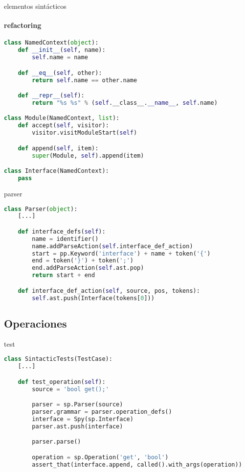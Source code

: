\documentclass[11pt]{beamer}
\begin{document}
\begin{frame}[fragile]{elementos sintácticos}
\framesubtitle{refactoring}
\begin{lstlisting}[language=Python]
class NamedContext(object):
    def __init__(self, name):
        self.name = name

    def __eq__(self, other):
        return self.name == other.name

    def __repr__(self):
        return "%s %s" % (self.__class__.__name__, self.name)

class Module(NamedContext, list):
    def accept(self, visitor):
        visitor.visitModuleStart(self)

    def append(self, item):
        super(Module, self).append(item)

class Interface(NamedContext):
    pass
\end{lstlisting}
\end{frame}


\begin{frame}[fragile]{parser}
\begin{lstlisting}[language=Python]
class Parser(object):
    [...]

    def interface_defs(self):
        name = identifier()
        name.addParseAction(self.interface_def_action)
        start = pp.Keyword('interface') + name + token('{')
        end = token('}') + token(';')
        end.addParseAction(self.ast.pop)
        return start + end

    def interface_def_action(self, source, pos, tokens):
        self.ast.push(Interface(tokens[0]))
\end{lstlisting}
\end{frame}


\subsection{Operaciones}

\begin{frame}[fragile]{test}
\begin{lstlisting}[language=Python]
class SintacticTests(TestCase):
    [...]

    def test_operation(self):
        source = 'bool get();'

        parser = sp.Parser(source)
        parser.grammar = parser.operation_defs()
        interface = Spy(sp.Interface)
        parser.ast.push(interface)

        parser.parse()

        operation = sp.Operation('get', 'bool')
        assert_that(interface.append, called().with_args(operation))
\end{lstlisting}
\end{frame}
\end{document}
